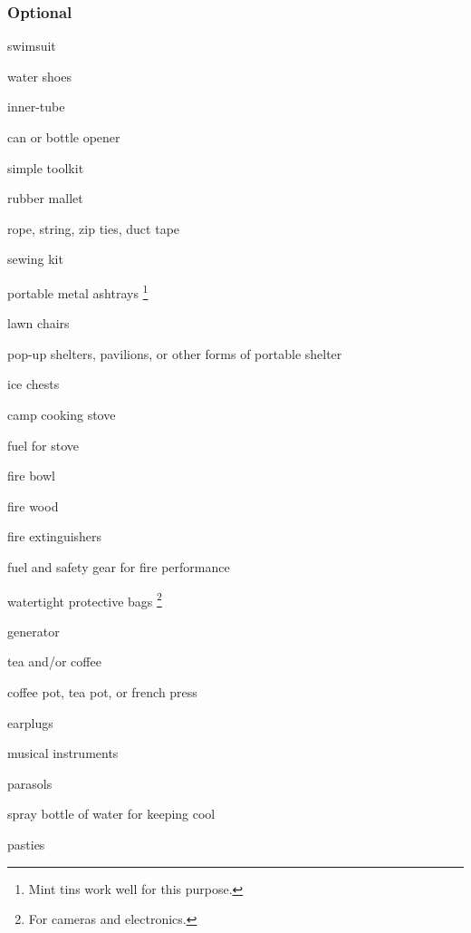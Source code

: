 \begin{multicols}{2}
% 
% 

\end{multicols}

\subsubsection*{Optional}

\begin{multicols}{2}

\begin{checklist}
    \item swimsuit
    \item water shoes
    \item inner-tube
    \item can or bottle opener
    \item simple toolkit
    \item rubber mallet
    \item rope, string, zip ties, duct tape
    \item sewing kit
    \item portable metal ashtrays \footnote{Mint tins work well for this purpose.}
    \item lawn chairs
    \item pop-up shelters, pavilions, or other forms of portable shelter
    \item ice chests
    \item camp cooking stove
    \item fuel for stove 
    \item fire bowl
    \item fire wood
    \item fire extinguishers
    \item fuel and safety gear for fire performance
    \item watertight protective bags \footnote{For cameras and electronics.}
    \item generator
    \item tea and/or coffee
    \item coffee pot, tea pot, or french press
    \item earplugs
    \item musical instruments
    \item parasols
	\item spray bottle of water for keeping cool
    \item pasties 
\end{checklist}

\end{multicols}



